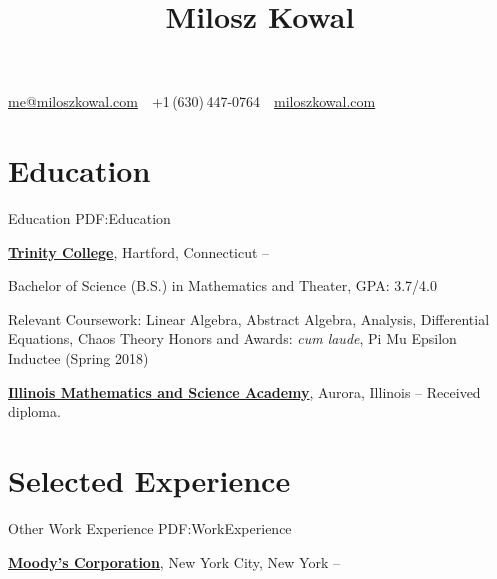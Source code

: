 \documentclass[letterpaper,10pt,oneside]{article}
\newcommand{\CVAuthor}{Milosz Kowal}
\newcommand{\CVWebpage}{https://miloszkowal.com}
\begin{document}

\title{\CVAuthor}

\begin{subtitle}
\par
\href{mailto:me@miloszkowal.com}
{me@miloszkowal.com}
\,\SubBulletSymbol\,
+1\,(630)\,447-0764
\,\SubBulletSymbol\,
\href{\CVWebpage}
{miloszkowal.com}
\end{subtitle}

\begin{body}


\section
{Education}
{Education}
{PDF:Education}

\href{http://www.trincoll.edu}
{\textbf{Trinity College}},
Hartford, Connecticut
\hfill
{} --

\GapNoBreak
\BulletItem
Bachelor of Science (B.S.) in
Mathematics and Theater, GPA: 3.7/4.0
\begin{detail}
\SubBulletItem
Relevant Coursework: Linear Algebra, Abstract Algebra, Analysis, Differential Equations, Chaos Theory
\SubBulletItem
Honors and Awards: \textit{cum laude}, Pi Mu Epsilon Inductee (Spring 2018)
\end{detail}

\GapNoBreak
\href{http://www.imsa.edu}
{\textbf{Illinois Mathematics and Science Academy}},
Aurora, Illinois
\hfill
{} --
\GapNoBreak
\BulletItem
Received diploma.


\noindent\hrulefill
\section
{Selected\newline
Experience}
{Other Work Experience}
{PDF:WorkExperience}

\href{http://www.moodys.com}
{\textbf{Moody's Corporation}},
New York City, New York
\hfill
{} --


\end{body}
\end{document}
